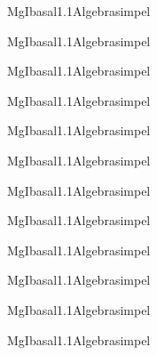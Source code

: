 \documentclass[12pt]{article}
\begin{document}
\pagecolor{lightgray!30}

\begin{Add}{MgI}{basal1.1}{Algebra}{simpel}
\solution{ }
\end{Add}
\begin{Add}{MgI}{basal1.1}{Algebra}{simpel}
\end{Add}

\begin{Add}{MgI}{basal1.1}{Algebra}{simpel}
\solution{ }
\end{Add}
\begin{Add}{MgI}{basal1.1}{Algebra}{simpel}
\end{Add}

\begin{Add}{MgI}{basal1.1}{Algebra}{simpel}
\solution{ }
\end{Add}
\begin{Add}{MgI}{basal1.1}{Algebra}{simpel}
\end{Add}

\begin{Add}{MgI}{basal1.1}{Algebra}{simpel}
\solution{ }
\end{Add}
\begin{Add}{MgI}{basal1.1}{Algebra}{simpel}
\end{Add}

\begin{Add}{MgI}{basal1.1}{Algebra}{simpel}
\solution{ }
\end{Add}
\begin{Add}{MgI}{basal1.1}{Algebra}{simpel}
\end{Add}

\begin{Add}{MgI}{basal1.1}{Algebra}{simpel}
\solution{ }
\end{Add}
\begin{Add}{MgI}{basal1.1}{Algebra}{simpel}
\end{Add}
\end{document}
